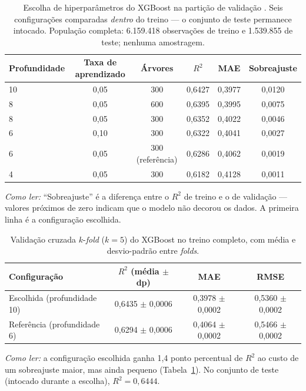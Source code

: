 \begin{table}[!ht]
\centering
\caption{Escolha de hiperparâmetros do XGBoost na partição de validação
\cite{alencar2026a, alencar2026b, alencar2026c, geron2021}. Seis configurações comparadas
\emph{dentro} do treino --- o conjunto de teste permanece intocado. População completa:
6.159.418 observações de treino e 1.539.855 de teste; nenhuma amostragem.}
\label{tab:ml_cv}
\small
\begin{tabular}{lccccc}
\toprule
Profundidade & Taxa de aprendizado & Árvores & $R^2$ & MAE & Sobreajuste \\
\midrule
{10} & 0,05 & 300 & 0,6427 & 0,3977 & 0,0120 \\
8 & 0,05 & 600 & 0,6395 & 0,3995 & 0,0075 \\
8 & 0,05 & 300 & 0,6352 & 0,4022 & 0,0046 \\
6 & 0,10 & 300 & 0,6322 & 0,4041 & 0,0027 \\
6 & 0,05 & 300 (referência) & 0,6286 & 0,4062 & 0,0019 \\
4 & 0,05 & 300 & 0,6182 & 0,4128 & 0,0011 \\
\bottomrule
\end{tabular}
\normalsize
\par\smallskip
\footnotesize\emph{Como ler:} ``Sobreajuste'' é a diferença entre o $R^2$ de treino e o de
validação --- valores próximos de zero indicam que o modelo não decorou os dados. A
primeira linha é a configuração escolhida.
\end{table}

\begin{table}[!ht]
\centering
\caption{Validação cruzada $k$-\emph{fold} ($k=5$) do XGBoost no treino completo,
com média e desvio-padrão entre \emph{folds}.}
\label{tab:ml_cv_b}
\small
\begin{tabular}{lccc}
\toprule
Configuração & $R^2$ (média $\pm$ dp) & MAE & RMSE \\
\midrule
Escolhida (profundidade 10) & 0,6435 $\pm$ 0,0006 & 0,3978 $\pm$ 0,0002 & 0,5360 $\pm$ 0,0002 \\
Referência (profundidade 6) & 0,6294 $\pm$ 0,0006 & 0,4064 $\pm$ 0,0002 & 0,5466 $\pm$ 0,0002 \\
\bottomrule
\end{tabular}
\normalsize
\par\smallskip
\footnotesize\emph{Como ler:} a configuração escolhida ganha 1,4 ponto percentual
de $R^2$ ao custo de um sobreajuste maior, mas ainda pequeno (Tabela~\ref{tab:ml_cv}). No
conjunto de teste (intocado durante a escolha), $R^2 = 0,6444$.
\end{table}
